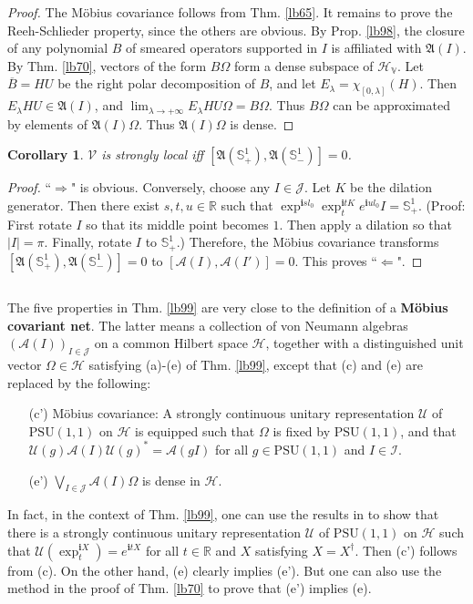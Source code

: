 \documentclass[12pt,b5paper,notitlepage]{article}
\theoremstyle{definition}
\theoremstyle{plain}
\newtheorem{co}[df]{Corollary}
\newcommand{\fk}{\mathfrak}
\newcommand{\mc}{\mathcal}
\newcommand{\ovl}{\overline}
\newcommand{\PSU}{\mathrm{PSU}(1,1)}
\newcommand{\im}{\mathbf{i}}
\newcommand{\Rbb}{\mathbb R}
\newcommand{\Sbb}{{\mathbb S}}
\newcommand{\HV}{\mathcal H_{\mathbb V}}
\newcommand{\MV}{\mathcal V}
\numberwithin{equation}{section}
\begin{document}
\begin{proof}
The M\"obius covariance follows from Thm. \ref{lb65}. It remains to prove the Reeh-Schlieder property, since the others are obvious. By Prop. \ref{lb98}, the closure of any polynomial $B$ of smeared operators supported in $I$ is affiliated with $\fk A(I)$. By Thm. \ref{lb70}, vectors of the form $B\Omega$ form a dense subspace of $\HV$. Let $\ovl B=HU$ be the right polar decomposition of $B$, and let $E_\lambda=\chi_{[0,\lambda]}(H)$. Then $E_\lambda HU\in\fk A(I)$, and $\lim_{\lambda\rightarrow+\infty}E_\lambda HU\Omega=B\Omega$. Thus $B\Omega$ can be approximated by elements of $\fk A(I)\Omega$. Thus $\fk A(I)\Omega$ is dense.
\end{proof}


\begin{co}
$\MV$ is strongly local iff $[\fk A(\Sbb^1_+),\fk A(\Sbb^1_-)]=0$.
\end{co}

\begin{proof}
``$\Rightarrow$" is obvious. Conversely, choose any $I\in\mc J$. Let $K$ be the dilation generator. Then there exist $s,t,u\in\Rbb$ such that $\exp^{\im sl_0}\exp^{\im tK}_te^{\im ul_0}I=\Sbb^1_+$. (Proof: First rotate $I$ so that its middle point becomes $1$. Then apply a dilation so that $|I|=\pi$. Finally, rotate $I$ to $\Sbb^1_+$.) Therefore, the M\"obius covariance transforms $[\fk A(\Sbb^1_+),\fk A(\Sbb^1_-)]=0$ to $[\mc A(I),\mc A(I')]=0$. This proves ``$\Leftarrow$".
\end{proof}



\subsection{}


The five properties in Thm. \ref{lb99} are very close to the definition of a \textbf{M\"obius covariant net}. The latter means a collection of von Neumann algebras $(\mc A(I))_{I\in\mc J}$ on a common Hilbert space $\mc H$, together with a distinguished unit vector $\Omega\in\mc H$ satisfying (a)-(e) of Thm. \ref{lb99}, except that (c) and (e) are replaced by the following:
\begin{enumerate}
\item[(c')] M\"obius covariance: A strongly continuous unitary representation $\mc U$ of $\PSU$ on $\mc H$ is equipped such that $\Omega$ is fixed by $\PSU$, and that $\mc U(g)\mc A(I)\mc U(g)^*=\mc A(gI)$ for all $g\in\PSU$ and $I\in\mc I$.
\item[(e')] $\bigvee_{I\in\mc J}\mc A(I)\Omega$ is dense in $\mc H$. 
\end{enumerate}
In fact, in the context of Thm. \ref{lb99}, one can use the results in \cite{Tol99} to show that there is a strongly continuous unitary representation $\mc U$ of $\PSU$ on $\mc H$ such that $\mc U(\exp^{\im X}_t)=e^{\im tX}$ for all $t\in\Rbb$ and $X$ satisfying $X=X^\dagger$. Then (c') follows from (c). On the other hand, (e) clearly implies (e'). But one can also use the method in the proof of Thm. \ref{lb70} to prove that (e') implies (e).
\end{document}
